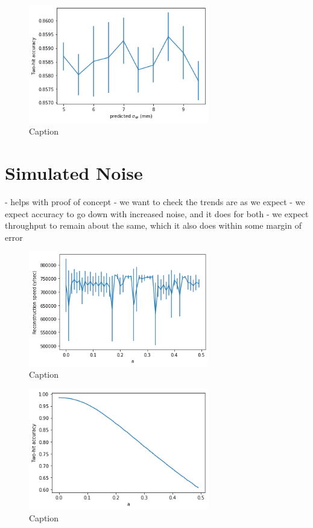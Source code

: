 \begin{figure}
    \centering
    \includegraphics[width=0.7\textwidth]{graphs/pi_spFactor_acc.png}
    \caption{Caption}
    \label{fig:my_label}
\end{figure}

\section{Simulated Noise}
- helps with proof of concept - we want to check the trends are as we expect
- we expect accuracy to go down with increased noise, and it does for both
- we expect throughput to remain about the same, which it also does within some margin of error

\begin{figure}
    \centering
    \includegraphics[width=0.7\textwidth]{graphs/pi_enNoise_speed.png}
    \caption{Caption}
    \label{fig:my_label}
\end{figure}

\begin{figure}
    \centering
    \includegraphics[width=0.7\textwidth]{graphs/pi_enNoise_acc.png}
    \caption{Caption}
    \label{fig:my_label}
\end{figure}

